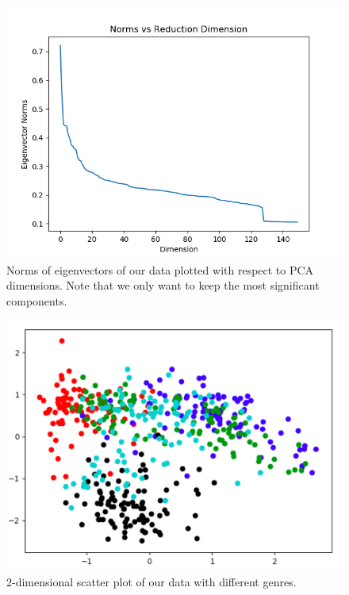 \begin{figure}
\begin{center}
\includegraphics[scale=0.3]{./figures/pca_eig.png}
\end{center}
\caption
{
Norms of eigenvectors of our data plotted with respect to PCA dimensions. Note that we only want to keep the most significant components.
}
\label{fig:big_picture5}
\end{figure}

\begin{figure}
\begin{center}
\includegraphics[scale=0.3]{./figures/2_d_plot.png}
\end{center}
\caption
{
2-dimensional scatter plot of our data with different genres. 
}
\label{fig:big_picture5}
\end{figure}

